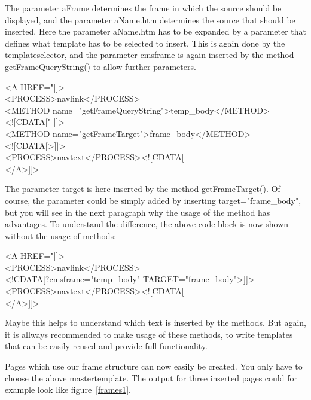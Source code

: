 The parameter {\name aFrame} determines the frame in which the source should be displayed,
and the parameter {\name aName.htm} determines the source that should be inserted.
Here the parameter {\name aName.htm} has to be expanded by a parameter that defines what template has
to be selected to insert. This is again done by the templateselector, and the parameter
{\name cmsframe} is again inserted by the method {\meth getFrameQueryString()} to allow further
parameters.

\begin{xml}
<A HREF="]]>\\
  <PROCESS>navlink</PROCESS>\\
    <METHOD name="getFrameQueryString">temp\_body</METHOD>\\
    <![CDATA[" ]]>\\
    <METHOD name="getFrameTarget">frame\_body</METHOD>\\
    <![CDATA[>]]>\\
  <PROCESS>navtext</PROCESS><![CDATA[\\
</A>]]>\\
\end{xml}


The parameter {\name target} is here inserted by the method {\meth getFrameTarget()}. 
Of course, the parameter could be simply added by inserting
{\tag target="frame\_body"}, but you will see in the next paragraph why the usage of the method
has advantages.
To understand the difference, the above code block is now shown without the usage of
methods:
\begin{xml}
<A HREF="]]>\\
  <PROCESS>navlink</PROCESS>\\
    <!CDATA[?cmsframe="temp\_body" TARGET="frame\_body">]]>\\
  <PROCESS>navtext</PROCESS><![CDATA[\\
</A>]]>\\
\end{xml}


Maybe this helps to understand which text is inserted by the methods. But again, it is allways
recommended to make usage of these methods, to write templates that can be easily reused and
provide full functionality.

Pages which use our frame structure can now easily be created. 
You only have to choose the above mastertemplate. 
The output for three inserted pages could for example look like
figure~\ref{frames1}.

